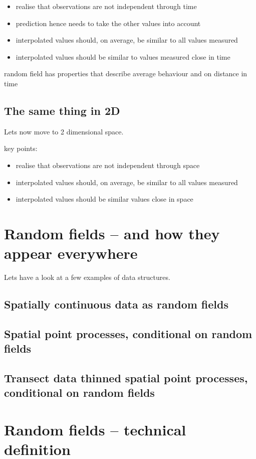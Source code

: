 \begin{itemize}
\item realise that observations are not independent through time
\item prediction hence needs to take the other values into account 
\item interpolated values should, on average, be similar to all values measured
\item interpolated values should be similar to values measured close in time
\end{itemize}



random field has properties that describe average behaviour and on distance in time


\subsection{The same thing in 2D}
Lets now move to 2 dimensional space. 

key points:
\begin{itemize}
\item realise that observations are not independent through space
\item interpolated values should, on average, be similar to all values measured
\item interpolated values should be similar values close in space
\end{itemize}

\section{Random fields -- and how they appear everywhere}

Lets have a look at a few examples of data structures.

\subsection{Spatially continuous data as random fields}

\subsection{Spatial point processes, conditional on random fields}

\subsection{Transect data thinned spatial point processes, conditional on random fields}

\section{Random fields -- technical definition}

